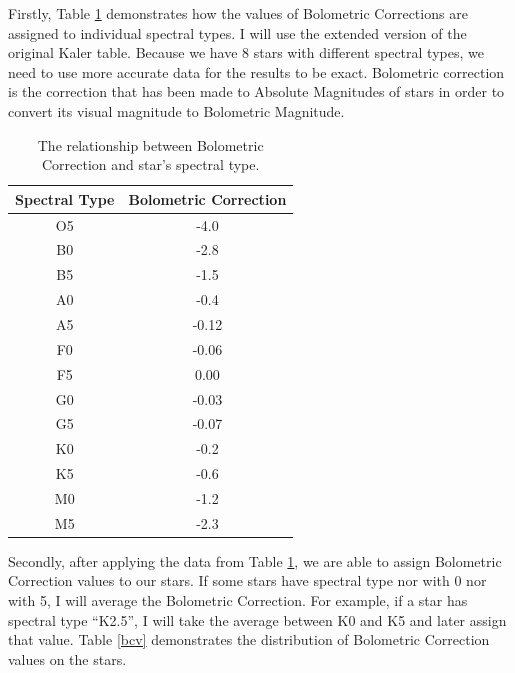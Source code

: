 \documentclass{article}
\begin{document}
Firstly, Table \ref{bc} demonstrates how the values of Bolometric Corrections are assigned to individual spectral types. I will use the extended version of the original Kaler table\cite{kaler}. Because we have 8 stars with different spectral types, we need to use more accurate data for the results to be exact. Bolometric correction is the correction that has been made to Absolute Magnitudes of stars in order to convert its visual magnitude to Bolometric Magnitude.\cite{bc}\\
  
  \begin{table}[h!]
    \begin{center}
      \centering
      \caption{The relationship between Bolometric Correction and star's spectral type.}
      \begin{tabular}{c | c}
        \textbf{Spectral Type} & \textbf{Bolometric Correction} \\
        \hline
        O5 & -4.0 \\
        B0 & -2.8 \\
        B5 & -1.5 \\
        A0 & -0.4 \\
        A5 & -0.12\\
        F0 & -0.06\\
        F5 & 0.00 \\
        G0 & -0.03\\
        G5 & -0.07\\
        K0 & -0.2 \\
        K5 & -0.6 \\
        M0 & -1.2 \\
        M5 & -2.3 \\
      \end{tabular}
      \label{bc}
    \end{center}
  \end{table}

  Secondly, after applying the data from Table \ref{bc}, we are able to assign Bolometric Correction values to our stars. If some stars have spectral type nor with 0 nor with 5, I will average the Bolometric Correction. For example, if a star has spectral type ``K2.5'', I will take the average between K0 and K5 and later assign that value. Table \ref{bcv} demonstrates the distribution of Bolometric Correction values on the stars.\\
\end{document}
